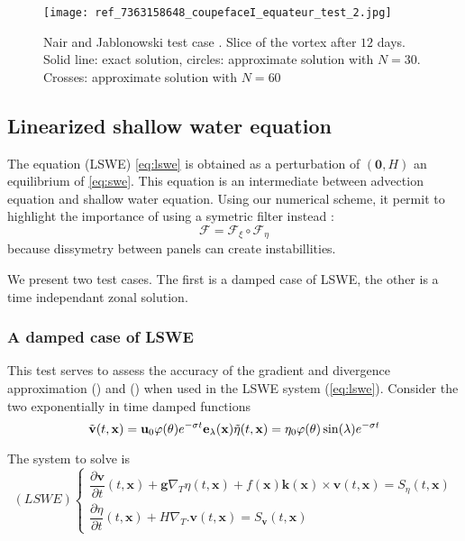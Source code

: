 \begin{figure}[ht!]
\texttt{[image: ref\_7363158648\_coupefaceI\_equateur\_test\_2.jpg]}
\label{coupe-NJ-1}
\caption{Nair and Jablonowski test case \cite{Nair-Jablonowski}. Slice 
of the vortex after $12$ days. Solid line: exact solution, circles:
approximate solution with $N=30$. Crosses: approximate solution with $N=60$}
\end{figure}

\subsection{Linearized shallow water equation}

The equation (LSWE) \eqref{eq:lswe} is obtained as a perturbation of $(\mathbf{0},H)$ an equilibrium of \eqref{eq:swe}. This equation is an intermediate between advection equation and shallow water equation.
Using our numerical scheme, it permit to highlight the importance of using a symetric filter instead :
\begin{equation}
\mathcal{F} = \mathcal{F}_{\xi} \circ \mathcal{F}_{\eta}
\end{equation}
because dissymetry between panels can create instabillities.

We present two test cases. The first is a damped case of LSWE, the other is a time independant zonal solution.

\subsubsection{A damped case of LSWE}

This test serves to assess the accuracy of the 
gradient and divergence approximation () and () when
used in the LSWE system (\ref{eq:lswe}). 
Consider the two exponentially in time damped functions
\begin{equation}
\tilde{\mathbf{v}} (t,\mathbf{x})=\mathbf{u}_0 \varphi(\theta) e^{-\sigma t}\mathbf{e}_\lambda(\mathbf{x})\\
\tilde{\eta}(t,\mathbf{x})= \eta_0 \varphi(\theta) \sin(\lambda)e^{-\sigma t} 
\end{equation}

The system to solve is
\begin{equation}
\label{eq:lswe_damped}
(LSWE) \left\{
\begin{array}{l}
\dfrac{\partial \mathbf{v}}{\partial t} (t,\mathbf{x})+ \mathbf{g} \nabla_T \eta(t,\mathbf{x}) + f(\mathbf{x}) \mathbf{k}(\mathbf{x}) \times
\mathbf{v}(t,\mathbf{x})=S_{\eta}(t,\mathbf{x})\\
\dfrac{\partial \eta}{\partial t}(t,\mathbf{x})+ H \nabla_T . \mathbf{v}(t,\mathbf{x})=S_{\mathbf{v}}(t,\mathbf{x})
\end{array}
\right.
\end{equation}

